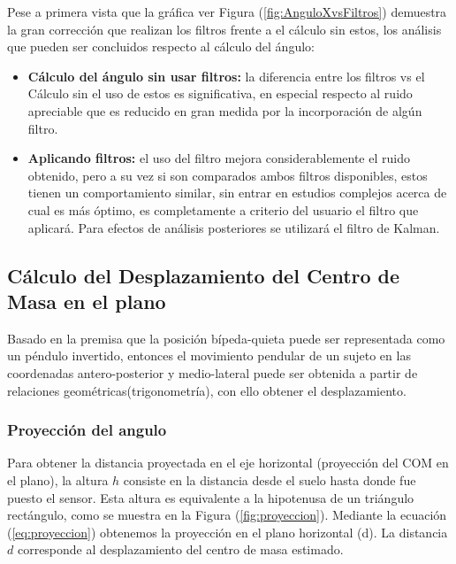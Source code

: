 \documentclass[12pt,a4paper]{article}
\begin{document}
Pese a primera vista que la gráfica ver Figura (\ref{fig:AnguloXvsFiltros}) demuestra la gran corrección que realizan los filtros frente a el cálculo sin estos, los análisis que pueden ser concluidos respecto al cálculo del ángulo:
\begin{itemize}
	\item \textbf{Cálculo del ángulo sin usar filtros:} la diferencia entre los filtros vs el Cálculo sin el uso de estos es significativa, en especial respecto al ruido apreciable que es reducido en gran medida por la incorporación de algún filtro.
	\item \textbf{Aplicando filtros:} el uso del filtro mejora considerablemente el ruido obtenido, pero a su vez si son comparados ambos filtros disponibles, estos tienen un comportamiento similar, sin entrar en estudios complejos acerca de cual es más óptimo, es completamente a criterio del usuario el filtro que aplicará.
	Para efectos de análisis posteriores se utilizará el filtro de Kalman.
\end{itemize}


\subsection{Cálculo del Desplazamiento del Centro de Masa en el plano}

Basado en la premisa que la posición bípeda-quieta puede ser representada como un péndulo invertido\cite{gage_kinematic_2004}, entonces el movimiento pendular de un sujeto en las coordenadas antero-posterior y medio-lateral puede ser obtenida a partir de relaciones geométricas(trigonometría), con ello obtener el desplazamiento.


\subsubsection{Proyección del angulo}
Para obtener la distancia proyectada en el eje horizontal (proyección del COM en el plano), la altura $h$ consiste en la distancia desde el suelo hasta donde fue puesto el sensor. Esta altura es equivalente a la hipotenusa de un triángulo rectángulo, como se muestra en la Figura (\ref{fig:proyeccion}). Mediante la ecuación (\ref{eq:proyeccion}) obtenemos la proyección en el plano horizontal (d). La distancia $d$ corresponde al desplazamiento del centro de masa estimado.
\end{document}
